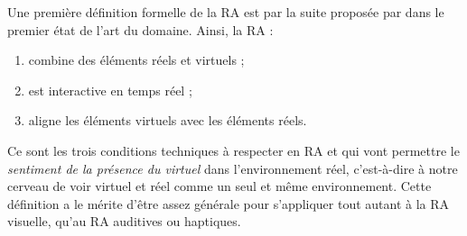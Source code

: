 
Une première définition formelle de la RA est par la suite proposée par \cite{Azuma1997} dans le premier état de l'art du domaine. Ainsi, la RA :
\begin{enumerate}
  \item combine des éléments réels et virtuels ;
  \item est interactive en temps réel ;
  \item aligne les éléments virtuels avec les éléments réels.
\end{enumerate}
Ce sont les trois conditions techniques à respecter en RA et qui vont permettre le \emph{sentiment de la présence du virtuel} dans l'environnement réel, c'est-à-dire à notre cerveau de voir virtuel et réel comme un seul et même environnement. Cette définition a le mérite d'être assez générale pour s'appliquer tout autant à la RA visuelle, qu'au RA auditives ou haptiques.


